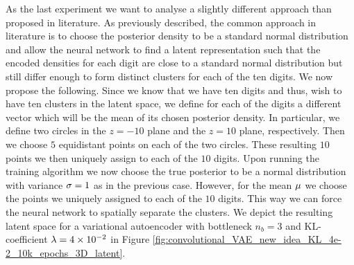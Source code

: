 As the last experiment we want to analyse a slightly different approach than proposed in literature. As previously described, the common approach in literature is to choose the posterior density to be a standard normal distribution and allow the neural network to find a latent representation such that the encoded densities for each digit are close to a standard normal distribution but still differ enough to form distinct clusters for each of the ten digits. We now propose the following. Since we know that we have ten digits and thus, wish to have ten clusters in the latent space, we define for each of the digits a different vector which will be the mean of its chosen posterior density. In particular, we define two circles in the $z=-10$ plane and the $z=10$ plane, respectively. Then we choose $5$ equidistant points on each of the two circles. These resulting $10$ points we then uniquely assign to each of the $10$ digits. Upon running the training algorithm we now choose the true posterior to be a normal distribution with variance $\operatorname{\sigma}=1$ as in the previous case. However, for the mean $\operatorname{\mu}$ we choose the points we uniquely assigned to each of the $10$ digits. This way we can force the neural network to spatially separate the clusters. We depict the resulting latent space for a variational autoencoder with bottleneck $n_b=3$ and KL-coefficient $\lambda=\num{4e-2}$ in Figure \ref{fig:convolutional_VAE_new_idea_KL_4e-2_10k_epochs_3D_latent}.

